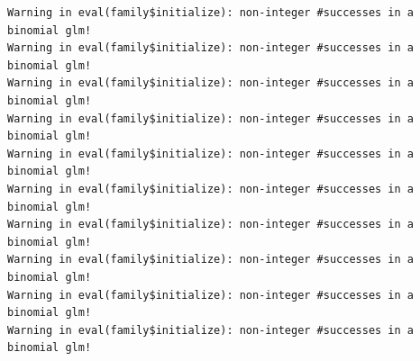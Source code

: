 \documentclass[
  letterpaper,
  DIV=11,
  numbers=noendperiod]{scrartcl}
\begin{document}
\begin{verbatim}
Warning in eval(family$initialize): non-integer #successes in a binomial glm!
Warning in eval(family$initialize): non-integer #successes in a binomial glm!
Warning in eval(family$initialize): non-integer #successes in a binomial glm!
Warning in eval(family$initialize): non-integer #successes in a binomial glm!
Warning in eval(family$initialize): non-integer #successes in a binomial glm!
Warning in eval(family$initialize): non-integer #successes in a binomial glm!
Warning in eval(family$initialize): non-integer #successes in a binomial glm!
Warning in eval(family$initialize): non-integer #successes in a binomial glm!
Warning in eval(family$initialize): non-integer #successes in a binomial glm!
Warning in eval(family$initialize): non-integer #successes in a binomial glm!
\end{verbatim}
\end{document}
